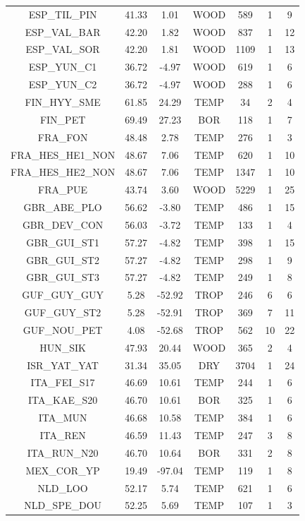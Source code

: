 \documentclass[11pt,twoside]{reedthesis}
\begin{document}
\begin{longtable}[t]{ccccccc}
ESP\_TIL\_PIN & 41.33 & 1.01 & WOOD & 589 & 1 & 9\\
ESP\_VAL\_BAR & 42.20 & 1.82 & WOOD & 837 & 1 & 12\\
ESP\_VAL\_SOR & 42.20 & 1.81 & WOOD & 1109 & 1 & 13\\
ESP\_YUN\_C1 & 36.72 & -4.97 & WOOD & 619 & 1 & 6\\
ESP\_YUN\_C2 & 36.72 & -4.97 & WOOD & 288 & 1 & 6\\
FIN\_HYY\_SME & 61.85 & 24.29 & TEMP & 34 & 2 & 4\\
FIN\_PET & 69.49 & 27.23 & BOR & 118 & 1 & 7\\
FRA\_FON & 48.48 & 2.78 & TEMP & 276 & 1 & 3\\
FRA\_HES\_HE1\_NON & 48.67 & 7.06 & TEMP & 620 & 1 & 10\\
FRA\_HES\_HE2\_NON & 48.67 & 7.06 & TEMP & 1347 & 1 & 10\\
FRA\_PUE & 43.74 & 3.60 & WOOD & 5229 & 1 & 25\\
GBR\_ABE\_PLO & 56.62 & -3.80 & TEMP & 486 & 1 & 15\\
GBR\_DEV\_CON & 56.03 & -3.72 & TEMP & 133 & 1 & 4\\
GBR\_GUI\_ST1 & 57.27 & -4.82 & TEMP & 398 & 1 & 15\\
GBR\_GUI\_ST2 & 57.27 & -4.82 & TEMP & 298 & 1 & 9\\
GBR\_GUI\_ST3 & 57.27 & -4.82 & TEMP & 249 & 1 & 8\\
GUF\_GUY\_GUY & 5.28 & -52.92 & TROP & 246 & 6 & 6\\
GUF\_GUY\_ST2 & 5.28 & -52.91 & TROP & 369 & 7 & 11\\
GUF\_NOU\_PET & 4.08 & -52.68 & TROP & 562 & 10 & 22\\
HUN\_SIK & 47.93 & 20.44 & WOOD & 365 & 2 & 4\\
ISR\_YAT\_YAT & 31.34 & 35.05 & DRY & 3704 & 1 & 24\\
ITA\_FEI\_S17 & 46.69 & 10.61 & TEMP & 244 & 1 & 6\\
ITA\_KAE\_S20 & 46.70 & 10.61 & BOR & 325 & 1 & 6\\
ITA\_MUN & 46.68 & 10.58 & TEMP & 384 & 1 & 6\\
ITA\_REN & 46.59 & 11.43 & TEMP & 247 & 3 & 8\\
ITA\_RUN\_N20 & 46.70 & 10.64 & BOR & 331 & 2 & 8\\
MEX\_COR\_YP & 19.49 & -97.04 & TEMP & 119 & 1 & 8\\
NLD\_LOO & 52.17 & 5.74 & TEMP & 621 & 1 & 6\\
NLD\_SPE\_DOU & 52.25 & 5.69 & TEMP & 107 & 1 & 3\\

\end{longtable}
\end{document}
